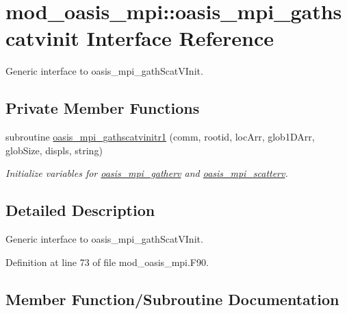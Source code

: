 \hypertarget{interfacemod__oasis__mpi_1_1oasis__mpi__gathscatvinit}{}\section{mod\+\_\+oasis\+\_\+mpi\+:\+:oasis\+\_\+mpi\+\_\+gathscatvinit Interface Reference}
\label{interfacemod__oasis__mpi_1_1oasis__mpi__gathscatvinit}


Generic interface to oasis\+\_\+mpi\+\_\+gath\+Scat\+V\+Init.  


\subsection*{Private Member Functions}
\begin{DoxyCompactItemize}
\item 
subroutine \hyperlink{interfacemod__oasis__mpi_1_1oasis__mpi__gathscatvinit_a15fc3df477e1fa561fcee17ed718bff8}{oasis\+\_\+mpi\+\_\+gathscatvinitr1} (comm, rootid, loc\+Arr, glob1\+D\+Arr, glob\+Size, displs, string)
\begin{DoxyCompactList}\small\item\em Initialize variables for \hyperlink{interfacemod__oasis__mpi_1_1oasis__mpi__gatherv}{oasis\+\_\+mpi\+\_\+gatherv} and \hyperlink{interfacemod__oasis__mpi_1_1oasis__mpi__scatterv}{oasis\+\_\+mpi\+\_\+scatterv}. \end{DoxyCompactList}\end{DoxyCompactItemize}


\subsection{Detailed Description}
Generic interface to oasis\+\_\+mpi\+\_\+gath\+Scat\+V\+Init. 

Definition at line 73 of file mod\+\_\+oasis\+\_\+mpi.\+F90.



\subsection{Member Function/\+Subroutine Documentation}
\mbox{\label{interfacemod__oasis__mpi_1_1oasis__mpi__gathscatvinit_a15fc3df477e1fa561fcee17ed718bff8}} 

